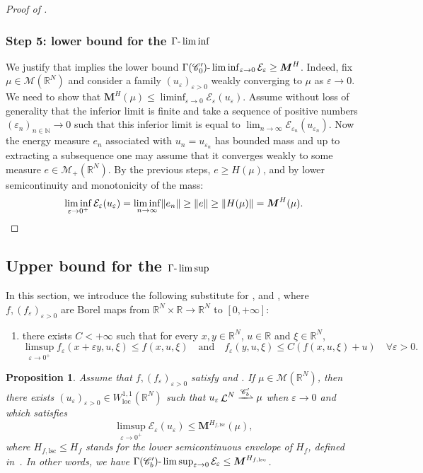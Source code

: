 \documentclass[10pt]{amsart}
\theoremstyle{plain}
\newtheorem{proposition}[theorem]{Proposition}
\theoremstyle{definition}
\newcommand{\N}{\mathbb{N}}
\newcommand{\R}{\mathbb{R}}
\newcommand{\Cspace}{\mathscr{C}}
\newcommand{\Mspace}{\mathscr{M}}
\newcommand{\ener}{\mathcal{E}}
\newcommand{\mass}{\boldsymbol{M}}
\newcommand{\loc}{\mathrm{loc}}
\newcommand{\lsc}{\mathrm{lsc}}
\newcommand{\eps}{\varepsilon}
\DeclarePairedDelimiter{\norm}{\lVert}{\rVert}
\DeclareMathOperator{\lbm}{\mathcal{L}}
\newcommand{\narrowto}{\xrightharpoonup{\Cspace_b'}}
\begin{document}
\begin{proof}[Proof of ]
\subsubsection*{Step 5: lower bound for the \(\Gamma\textup{-}\liminf\)} We justify that  implies the lower bound \(\Gamma(\Cspace_0')\textup{-}\liminf_{\eps \to 0} \ener_\eps \geq \mass^{H}\). Indeed, fix $\mu \in \Mspace(\R^N)$ and consider a family $(u_\eps)_{\eps>0}$ weakly converging to $\mu$ as $\eps \to 0$. We need to show that $\mass^H(\mu) \leq \liminf_{\eps \to 0} \ener_\eps(u_\eps)$. Assume without loss of generality that the inferior limit is finite and take a sequence of positive numbers \((\eps_n)_{n\in\N}\to 0\) such that this inferior limit is equal to $\lim_{n\to \infty} \ener_{\eps_n}(u_{\eps_n})$. Now the energy measure \(e_n\) associated with \(u_n=u_{\eps_n}\) has bounded mass and up to extracting a subsequence one may assume that it converges weakly to some measure $e\in \Mspace_+(\R^N)$. By the previous steps, $e \geq H(\mu)$, and by lower semicontinuity and monotonicity of the mass:
\[\liminf_{\eps\to 0^+} \ener_\eps(u_\eps) = \liminf_{n\to\infty} \norm{e_n} \geq \norm{e} \geq \norm{H(\mu)} = \mass^H(\mu).\qedhere\]
\end{proof}

\subsection{Upper bound for the \texorpdfstring{$\Gamma\textup{-}\limsup$}{Γ-limsup}}

In this section, we introduce the following substitute for ,  and , where $f,(f_\eps)_{\eps>0}$ are Borel maps from $\R^N\times \R \to \R^N$ to $[0,+\infty]$:
\begin{enumerate}[\textup{(U)},leftmargin=1.3\normalparindent]
\item\label{hypUpperGammaLimit} there exists \(C<+\infty\) such that for every \(x,y\in\R^N\), \(u\in\R\) and \(\xi\in\R^N\),
\[
\limsup_{\eps\to 0^+}f_\eps(x+\eps y,u,\xi)\leq f(x,u,\xi)\quad\text{and}\quad f_\eps(y,u,\xi)\leq C(f(x,u,\xi)+u)\quad\forall\eps>0.
\]
\end{enumerate}

\begin{proposition}\label{limsup_upper_bound}
Assume that $f,(f_\eps)_{\eps > 0}$ satisfy  and . If \(\mu \in \Mspace(\R^N)\), then there exists \((u_\eps)_{\eps>0} \in W^{1,1}_\loc(\R^N)\) such that $u_\eps \lbm^N \narrowto \mu$ when \(\eps\to 0\) and which satisfies
\[
\limsup_{\eps\to 0^+}\ener_\eps(u_\eps) \leq \mass^{H_{f,\lsc}}(\mu),
\]
where \(H_{f,\lsc}\leq H_f\) stands for the lower semicontinuous envelope of \(H_f\), defined in~. In other words, we have \(\Gamma(\Cspace_b')\textup{-}\limsup_{\eps \to 0} \ener_\eps \leq \mass^{H_{f,\lsc}}\).
\end{proposition}
\end{document}
